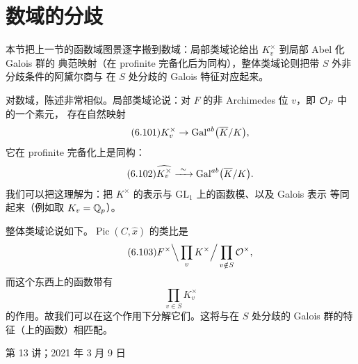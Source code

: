 \section{数域的分歧}

\begin{sectionkey}
本节把上一节的函数域图景逐字搬到数域：局部类域论给出 $K_v^{\times}$ 到局部 Abel 化 Galois 群的
典范映射（在 profinite 完备化后为同构），整体类域论则把带 $S$ 外非分歧条件的阿黛尔商与
在 $S$ 处分歧的 Galois 特征对应起来。
\end{sectionkey}

对数域，陈述非常相似。局部类域论说：对 $F$ 的非 Archimedes 位 $v$，即 $\mathcal{O}_F$ 中的一个素元，
存在自然映射
\begin{equation}\tag{6.101}\label{eq:6.101}
K_v^{\times}\to\mathrm{Gal}^{ab}\bigl(\overline{K}/K\bigr),
\end{equation}
它在 profinite 完备化上是同构：
\begin{equation}\tag{6.102}\label{eq:6.102}
\widehat{K_v^{\times}}\xrightarrow{\ \sim\ }\Gal^{ab}\bigl(\overline{K}/K\bigr).
\end{equation}
我们可以把这理解为：把 $K^{\times}$ 的表示与 $\mathrm{GL}_1$ 上的函数模、以及 Galois 表示
等同起来（例如取 $K_v=\mathbb{Q}_p$）。

整体类域论说如下。$\operatorname{Pic}(C,\widehat{x})$ 的类比是
\begin{equation}\tag{6.103}\label{eq:6.103}
F^{\times}\Big\backslash\prod_v K^{\times}\Big/\prod_{v\notin S}\mathcal{O}^{\times},
\end{equation}
而这个东西上的函数带有
\begin{equation}\tag{6.104}\label{eq:6.104}
\prod_{v\in S}K_v^{\times}
\end{equation}
的作用。故我们可以在这个作用下分解它们。这将与在 $S$ 处分歧的 Galois 群的特征（上的函数）相匹配。


\begin{flushright}
\small 第 13 讲；2021 年 3 月 9 日
\end{flushright}
